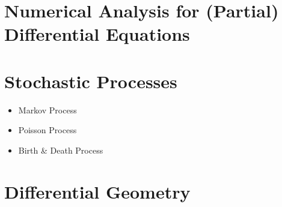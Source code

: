 \documentclass[10pt]{article}
\begin{document}
\section{Numerical Analysis for (Partial) Differential Equations}
\section{Stochastic Processes}
\begin{itemize}
	\item Markov Process
	\item Poisson Process
	\item Birth \& Death Process
\end{itemize}
\section{Differential Geometry}
\end{document}

